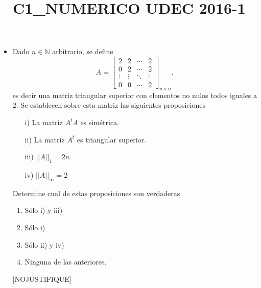 \documentclass[11pt]{article}
\newcommand{\buena}{[BUENA]}
\newcommand{\nojustifique}{[NOJUSTIFIQUE]}
\begin{document}
\title{C1_NUMERICO UDEC 2016-1}
\begin{itemize}

\item Dado $n\in\mathbb{N}$ arbitrario, se define
$$A=
\begin{bmatrix}
2 & 2 & \cdots & 2 \\
0 & 2 & \cdots & 2 \\
\vdots&\vdots & \ddots& \vdots \\
0 & 0 & \cdots & 2
\end{bmatrix}_{n\times n},
$$
es decir una matriz triangular superior con elementos no nulos todos iguales a $2$. Se establecen sobre esta matriz las siguientes proposiciones
\begin{enumerate}
\item[i)] La matriz $A^tA$ es sim\'etrica.
\item[ii)] La matriz $A^t$ es triangular superior.
\item[iii)] $||A||_{1}=2n$
\item[iv)]	$||A||_{\infty}=2$
\end{enumerate}
Determine cual de estas proposiciones son verdaderas
\begin{enumerate} 
\item\buena S\'olo i) y iii)
\item S\'olo i)
\item S\'olo ii) y iv)
\item Ninguna de las anteriores.
\end{enumerate}
\nojustifique 


\end{itemize}
\end{document}
